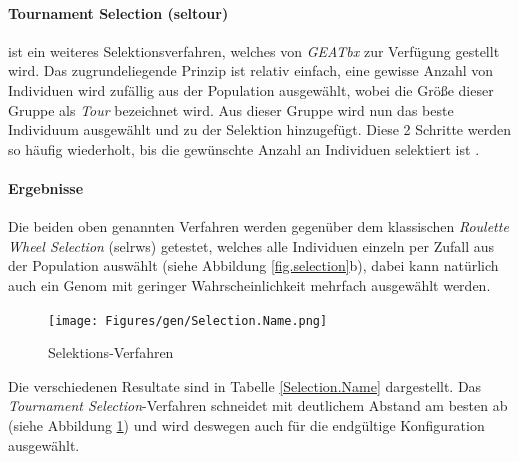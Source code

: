 \paragraph{Tournament Selection (seltour)} ist ein weiteres Selektionsverfahren,
welches von \emph{GEATbx} zur Verfügung gestellt wird. Das zugrundeliegende
Prinzip ist relativ einfach, eine gewisse Anzahl von Individuen wird zufällig
aus der Population ausgewählt, wobei die Größe dieser Gruppe als \emph{Tour}
bezeichnet wird. Aus dieser Gruppe wird nun das beste Individuum ausgewählt und
zu der Selektion hinzugefügt. Diese 2 Schritte werden so häufig wiederholt, bis
die gewünschte Anzahl an Individuen selektiert ist \cite{seltour}.


\paragraph{Ergebnisse} Die beiden oben genannten Verfahren werden gegenüber dem
klassischen \emph{Roulette Wheel Selection} (selrws) getestet, welches alle
Individuen einzeln per Zufall aus der Population auswählt (siehe Abbildung
\ref{fig.selection}b), dabei kann natürlich
auch ein Genom mit geringer Wahrscheinlichkeit mehrfach ausgewählt werden.



\begin{figure}[h!]
  \centering
  \texttt{[image: Figures/gen/Selection.Name.png]}
  \caption{Selektions-Verfahren}\label{fig.selectionname}
\end{figure}

\noindent Die verschiedenen Resultate sind in Tabelle \ref{Selection.Name}
dargestellt. Das \emph{Tournament Selection}-Verfahren schneidet mit deutlichem
Abstand am besten ab (siehe Abbildung \ref{fig.selectionname}) und wird deswegen
auch für die endgültige Konfiguration ausgewählt.

